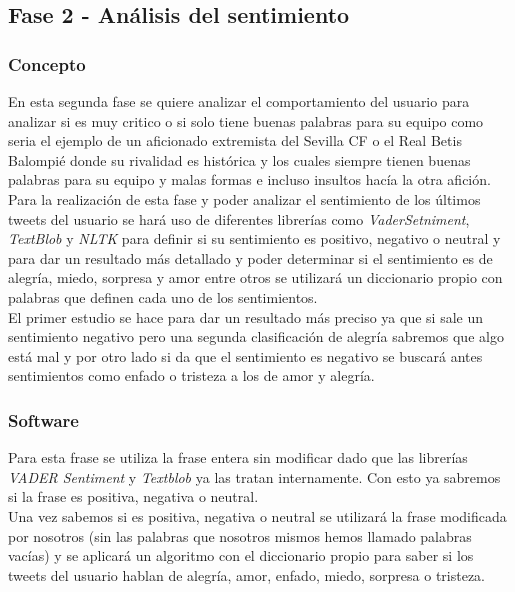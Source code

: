 \documentclass[../all.tex]{subfiles}
\begin{document}
\subsection{Fase 2 - Análisis del sentimiento}
    \subsubsection{Concepto}
    	En esta segunda fase se quiere analizar el comportamiento del usuario para analizar si es muy critico o si solo tiene buenas palabras para su equipo como seria el ejemplo de un aficionado extremista del Sevilla CF o el Real Betis Balompié donde su rivalidad es histórica y los cuales siempre tienen buenas palabras para su equipo y malas formas e incluso insultos hacía la otra afición.\\
    	
    	Para la realización de esta fase y poder analizar el sentimiento de los últimos tweets del usuario se hará uso de diferentes librerías como  \textit{VaderSetniment},  \textit{TextBlob} y  \textit{NLTK} para definir si su sentimiento es positivo, negativo o neutral y para dar un resultado más detallado y poder determinar si el sentimiento es de alegría, miedo, sorpresa y amor entre otros se utilizará un diccionario propio con palabras que definen cada uno de los sentimientos.\\
    	
    	 El primer estudio se hace para dar un resultado más preciso ya que si sale un sentimiento negativo pero una segunda clasificación de alegría sabremos que algo está mal y por otro lado si da que el sentimiento es negativo se buscará antes sentimientos como enfado o tristeza a los de amor y alegría.
    	 
    \newpage
    \subsubsection{Software}
    
    	Para esta frase se utiliza la frase entera sin modificar dado que las librerías \textit{VADER Sentiment} y \textit{Textblob} ya las tratan internamente. Con esto ya sabremos si la frase es positiva, negativa o neutral\cite{VADER}.\\
    	
    	Una vez sabemos si es positiva, negativa o neutral se utilizará la frase modificada por nosotros (sin las palabras que nosotros mismos hemos llamado palabras vacías) y se aplicará un algoritmo con el diccionario propio para saber si los tweets del usuario hablan de alegría, amor, enfado, miedo, sorpresa o tristeza.
        
\end{document}
